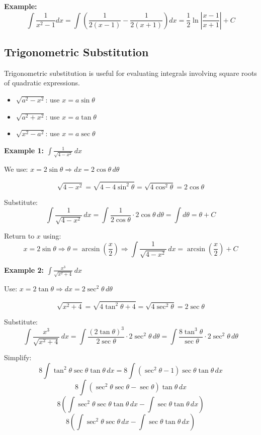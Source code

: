 \textbf{Example:}
\[
\int \frac{1}{x^2 - 1} dx = \int \left( \frac{1}{2(x - 1)} - \frac{1}{2(x + 1)} \right) dx = \frac{1}{2} \ln\left|\frac{x - 1}{x + 1}\right| + C
\]

\subsection{Trigonometric Substitution}

Trigonometric substitution is useful for evaluating integrals involving square roots of quadratic expressions.

\begin{itemize}[label=\(-\)]
    \item \(\sqrt{a^2 - x^2}\): use \(x = a \sin \theta\)
    \item \(\sqrt{a^2 + x^2}\): use \(x = a \tan \theta\)
    \item \(\sqrt{x^2 - a^2}\): use \(x = a \sec \theta\)
\end{itemize}

\textbf{Example 1: \( \int \frac{1}{\sqrt{4 - x^2}} \,dx \)}

We use: \( x = 2\sin \theta \Rightarrow dx = 2\cos \theta\, d\theta \)

\[
\sqrt{4 - x^2} = \sqrt{4 - 4\sin^2 \theta} = \sqrt{4\cos^2 \theta} = 2\cos \theta
\]

Substitute:
\[
\int \frac{1}{\sqrt{4 - x^2}} \,dx = \int \frac{1}{2\cos \theta} \cdot 2\cos \theta \,d\theta = \int d\theta = \theta + C
\]

Return to \( x \) using:
\[
x = 2\sin \theta \Rightarrow \theta = \arcsin\left(\frac{x}{2}\right)
\Rightarrow \boxed{\int \frac{1}{\sqrt{4 - x^2}} \,dx = \arcsin\left(\frac{x}{2}\right) + C}
\]


\textbf{Example 2: \( \int \frac{x^3}{\sqrt{x^2 + 4}} \,dx \)}

Use: \( x = 2\tan \theta \Rightarrow dx = 2\sec^2 \theta\, d\theta \)

\[
\sqrt{x^2 + 4} = \sqrt{4\tan^2 \theta + 4} = \sqrt{4\sec^2 \theta} = 2\sec \theta
\]

Substitute:
\[
\int \frac{x^3}{\sqrt{x^2 + 4}}\,dx = \int \frac{(2\tan \theta)^3}{2\sec \theta} \cdot 2\sec^2 \theta\, d\theta
= \int \frac{8\tan^3 \theta}{\sec \theta} \cdot 2\sec^2 \theta\, d\theta
\]

Simplify:
\[
8\int \tan^{2}\theta\sec\theta\tan\theta \,dx = 8\int (\sec^2\theta - 1)\sec\theta\tan\theta \,dx 
\]
\[
8\int (\sec^2\theta\sec\theta - \sec\theta)\tan\theta \,dx 
\]
\[
8\left(\int \sec^2\theta\sec\theta\tan\theta \,dx - \int\sec\theta\tan\theta \,dx \right) 
\]
\[
8\left(\int \sec^2\theta\sec\theta \,dx - \int\sec\theta\tan\theta \,dx \right) 
\]

